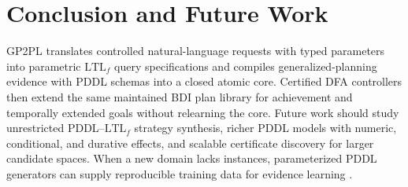 \documentclass[letterpaper]{article}
\newcommand{\ltlf}{\ensuremath{\mathrm{LTL}_f}}
\newif\ifgpplpublicrelease
\newcommand{\gpplreleaseurl}{https://github.com/daidaibunny/gp2pl}
\begin{document}





\FloatBarrier
\section{Conclusion and Future Work}

GP2PL translates controlled natural-language requests with typed parameters into
parametric \ltlf{} query specifications and compiles generalized-planning
evidence with PDDL schemas into a closed atomic core. Certified DFA controllers
then extend the same maintained BDI plan library for achievement and temporally
extended goals without relearning the core.
Future work should study unrestricted PDDL--\ltlf{} strategy synthesis, richer
PDDL models with numeric, conditional, and durative effects, and scalable
certificate discovery for larger candidate spaces.
When a new domain lacks instances, parameterized PDDL generators can supply
reproducible training data for evidence learning \cite{Bacchus2001AIPS00}.

\ifgpplpublicrelease
\paragraph{Code and data availability.}
Code, proofs, fixed evaluation records, and the versioned GP2PL temporal-goal
dataset are available at \url{\gpplreleaseurl}.
\fi


\end{document}
